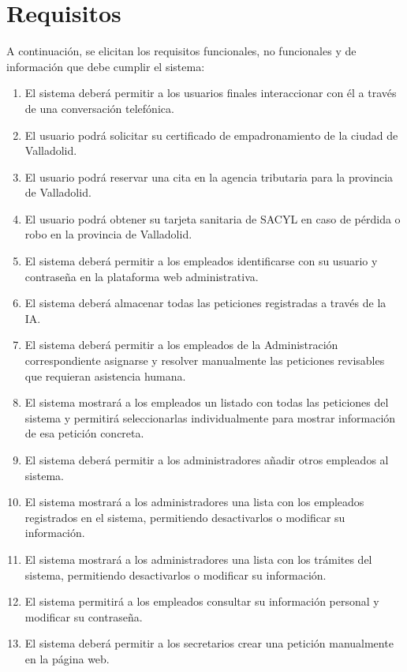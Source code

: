 \documentclass[12pt, a4paper, twoside]{report}
\begin{document}
    \section{Requisitos}
        A continuación, se elicitan los requisitos funcionales, no funcionales y de información que debe cumplir el sistema:
        \begin{enumerate}
            \item[RF1.] El sistema deberá permitir a los usuarios finales interaccionar con él a través de una conversación telefónica.
            \item[RF2.] El usuario podrá solicitar su certificado de empadronamiento de la ciudad de Valladolid.
            \item[RF3.] El usuario podrá reservar una cita en la agencia tributaria para la provincia de Valladolid.
            \item[RF4.] El usuario podrá obtener su tarjeta sanitaria de SACYL en caso de pérdida o robo en la provincia de Valladolid.
            \item[RF5.] El sistema deberá permitir a los empleados identificarse con su usuario y contraseña en la plataforma web administrativa.
            \item[RF6.] El sistema deberá almacenar todas las peticiones registradas a través de la IA.
            \item[RF7.] El sistema deberá permitir a los empleados de la Administración correspondiente asignarse y resolver manualmente las peticiones revisables que requieran asistencia humana.
            \item[RF8.] El sistema mostrará a los empleados un listado con todas las peticiones del sistema y permitirá seleccionarlas individualmente para mostrar información de esa petición concreta.
            \item[RF9.] El sistema deberá permitir a los administradores añadir otros empleados al sistema.
            \item[RF10.] El sistema mostrará a los administradores una lista con los empleados registrados en el sistema, permitiendo desactivarlos o modificar su información.
            \item[RF11.] El sistema mostrará a los administradores una lista con los trámites del sistema, permitiendo desactivarlos o modificar su información.
            \item[RF12.] El sistema permitirá a los empleados consultar su información personal y modificar su contraseña.
            \item[RF13.] El sistema deberá permitir a los secretarios crear una petición manualmente en la página web.
            

\end{enumerate}
\end{document}
